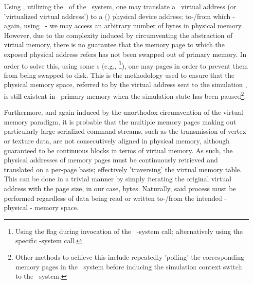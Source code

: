 Using \dvttermsimics , utilizing the \dvttermmmu\ of the \dvttermtarget\ system, one may translate a \dvttermtarget\ virtual address (or 'virtualized virtual address') to a (\dvttermtarget ) physical device address; to-/from which - again, using \dvttermsimics\ - we may access an arbitrary number of bytes in physical memory.
However, due to the complexity induced by circumventing the abstraction of virtual memory, there is no guarantee that the memory page to which the exposed physical address refers has not been swapped out of primary memory.
In order to solve this, using some \dvttermos s (e.g., \dvttermfedora \footnote{Using the  flag during invocation of the \dvttermlinux\ -system call; alternatively using the specific -system call.}), one may  pages in order to prevent them from being swapped to disk.
This is the methodology used to ensure that the physical memory space, referred to by the virtual address sent to the simulation \dvttermhost , is still existent in \dvttermtarget\ primary memory when the simulation state has been paused\footnote{Other methods to achieve this include repeatedly 'polling' the corresponding memory pages in the \dvttermtarget\ system before inducing the simulation context switch to the \dvttermhost\ system.}.

Furthermore, and again induced by the unorthodox circumvention of the virtual memory paradigm, it is probable that the multiple memory pages making out particularly large serialized command streams, such as the transmission of vertex or texture data, are not consecutively aligned in physical memory, although guaranteed to be continuous blocks in terms of virtual memory.
As such, the physical addresses of memory pages must be continuously retrieved and translated on a per-page basis; effectively 'traversing' the virtual memory table.
This can be done in a trivial manner by simply iterating the original virtual address with the \textit{\dvttermtarget } page size, in our case,  bytes.
Naturally, said process must be performed regardless of data being read or written to-/from the intended - physical - memory space.


